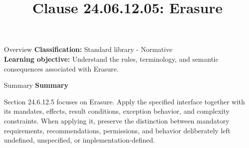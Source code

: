 \documentclass[10pt,letterpaper]{article}
\title{Clause 24.06.12.05: Erasure}
\author{}
\date{}
\begin{document}
\maketitle
\begin{CornellOverviewBox}{Overview}
\textbf{Classification:} Standard library - Normative\\[2pt]
\textbf{Learning objective:} Understand the rules, terminology, and semantic consequences associated with Erasure.
\end{CornellOverviewBox}\begin{CornellSummaryBox}{Summary}
{\sffamily\bfseries\color{Accent} Summary}\par\vspace{3pt}Section 24.6.12.5 focuses on Erasure. Apply the specified interface together with its mandates, effects, result conditions, exception behavior, and complexity constraints. When applying it, preserve the distinction between mandatory requirements, recommendations, permissions, and behavior deliberately left undefined, unspecified, or implementation-defined.
\end{CornellSummaryBox}
\end{document}
